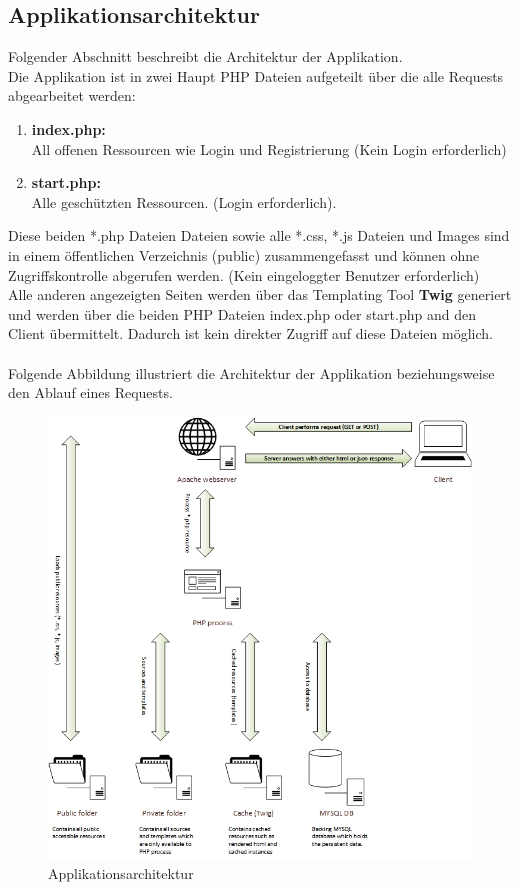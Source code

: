\documentclass[11pt, a4paper, twoside]{article}   	%
\begin{document}
\newpage
\subsection{Applikationsarchitektur}
Folgender Abschnitt beschreibt die Architektur der Applikation.\\
Die Applikation ist in zwei Haupt PHP Dateien aufgeteilt über die alle Requests abgearbeitet werden:
\begin{enumerate}
	\item \textbf{index.php:} \\
	All offenen Ressourcen wie Login und Registrierung (Kein Login erforderlich)
	\item \textbf{start.php:} \\
	Alle geschützten Ressourcen. (Login erforderlich).
\end{enumerate}
Diese beiden *.php Dateien Dateien sowie alle *.css, *.js Dateien und Images sind in einem öffentlichen Verzeichnis (public) zusammengefasst und können ohne Zugriffskontrolle abgerufen werden. (Kein eingeloggter Benutzer erforderlich)\\
Alle anderen angezeigten Seiten werden über das Templating Tool \textbf{Twig} generiert und werden über die beiden PHP Dateien index.php oder start.php and den Client übermittelt. Dadurch ist kein direkter Zugriff auf diese Dateien möglich.
\\\\
Folgende Abbildung illustriert die Architektur der Applikation beziehungsweise den Ablauf eines Requests. \\
\begin{figure}[h]
	\centering
	\includegraphics[scale=0.70]{images/Infrastructure.JPG}
	\caption
	{Applikationsarchitektur}
\end{figure}
\end{document}
